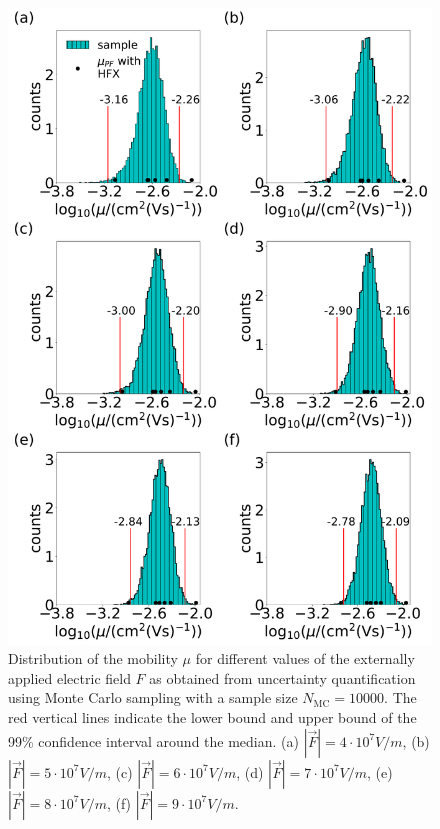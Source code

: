 \documentclass[%
 reprint,
superscriptaddress,
 amsmath,amssymb,
 aps,
prb,
floatfix
]{revtex4-2}
\begin{document}
\begin{figure}[tbp]
    \centering
    \includegraphics[width=\linewidth]{figs/fig_mle_withE_mu2_ave.pdf}
    \caption{Distribution of the mobility $\mu$ for different values of the externally applied electric field $F$ as obtained from uncertainty quantification using 
    Monte Carlo sampling with a sample size $N_\text{MC}=10000$. The red vertical lines indicate the lower bound and upper bound of the 99\% confidence interval around the median. (a) $|\vec{F}|=4 \cdot 10^7 \unit{V/m}$, (b) $|\vec{F}|=5 \cdot 10^7 \unit{V/m}$, (c) $|\vec{F}|=6 \cdot 10^7 \unit{V/m}$, (d) $|\vec{F}|=7 \cdot 10^7 \unit{V/m}$, (e) $|\vec{F}|=8 \cdot 10^7 \unit{V/m}$, (f) $|\vec{F}|=9 \cdot 10^7 \unit{V/m}$.}
    \label{fig:fig_mle_withE_mu2_ave}
\end{figure}
\end{document}
